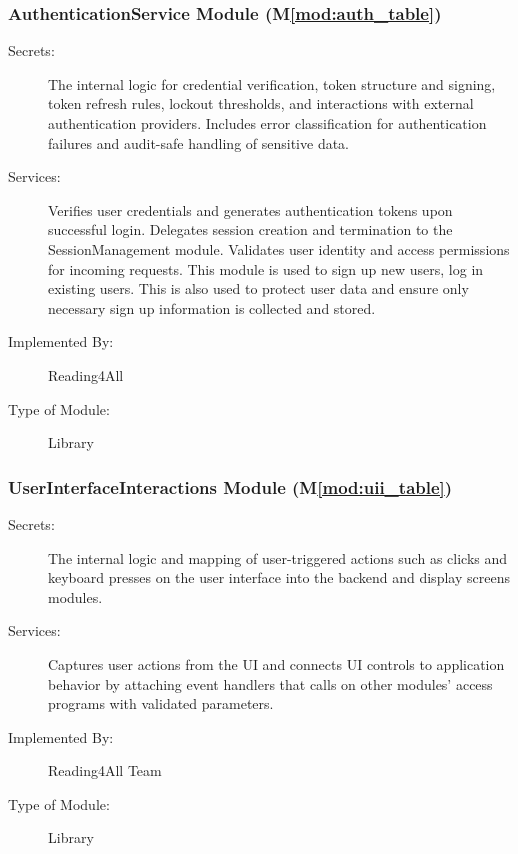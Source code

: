 \documentclass[12pt, titlepage]{article}
\newcommand{\mref}[1]{M\ref{#1}}
\begin{document}
\subsubsection{AuthenticationService Module (\mref{mod:auth_table})}
\label{mod:auth}
\begin{description}
  \item[Secrets:] The internal logic for credential verification,
    token structure and signing, token refresh rules, lockout
    thresholds, and interactions with external authentication providers.
    Includes error classification for authentication failures and
    audit-safe handling of sensitive data.
  \item[Services:] Verifies user credentials and generates authentication tokens upon successful login.
    Delegates session creation and termination to the SessionManagement module.
    Validates user identity and access permissions for incoming requests.
    This module is used to sign up new users, log in existing users. 
    This is also used to protect user data and ensure only necessary sign up information
    is collected and stored. 
  \item[Implemented By:] Reading4All
  \item[Type of Module:] Library
\end{description}

\subsubsection{UserInterfaceInteractions Module (\mref{mod:uii_table})}
\label{mod:uii}
\begin{description}
  \item[Secrets:] The internal logic and mapping of user-triggered
    actions such as clicks and keyboard presses
    on the user interface into the backend and display screens modules.
  \item[Services:] Captures user actions from the UI and connects UI
    controls to application
    behavior by attaching event handlers that calls on other modules’
    access programs with
    validated parameters.
  \item[Implemented By:] Reading4All Team
  \item[Type of Module:] Library
\end{description}
\end{document}
